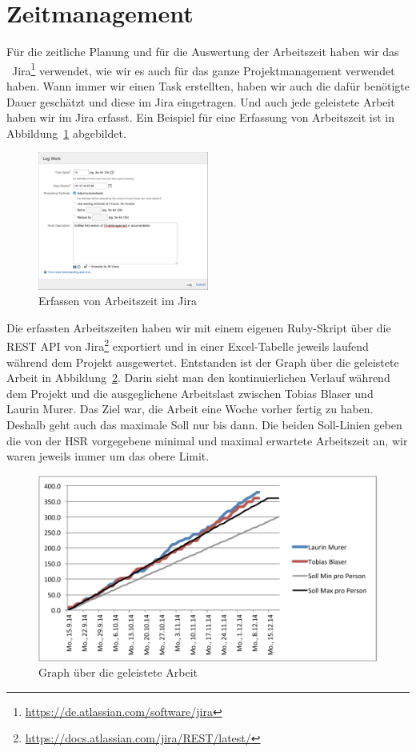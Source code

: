 \chapter*{Zeitmanagement}
	Für die zeitliche Planung und für die Auswertung der Arbeitszeit haben wir das \ppt\ Jira\footnote{\url{https://de.atlassian.com/software/jira}} verwendet,
	wie wir es auch für das ganze Projektmanagement verwendet haben.
	Wann immer wir einen Task erstellten, haben wir auch die dafür benötigte Dauer geschätzt
	und diese im Jira eingetragen.
	Und auch jede geleistete Arbeit haben wir im Jira erfasst.
	Ein Beispiel für eine Erfassung von Arbeitszeit ist in Abbildung\ \ref{fig:logWork} abgebildet.
	\begin{figure}[H]
		\includegraphics[width=0.5\textwidth]{projectPlan/media/img/logWork.png}
		\centering
		\caption{Erfassen von Arbeitszeit im Jira}
		\label{fig:logWork}
	\end{figure}
	
	Die erfassten Arbeitszeiten haben wir mit einem eigenen Ruby-Skript über die REST API von Jira\footnote{\url{https://docs.atlassian.com/jira/REST/latest/}} exportiert
	und in einer Excel-Tabelle jeweils laufend während dem Projekt ausgewertet.
	Entstanden ist der Graph über die geleistete Arbeit in Abbildung\ \ref{fig:workGraph}.
	Darin sieht man den kontinuierlichen Verlauf während dem Projekt
	und die ausgeglichene Arbeitslast zwischen Tobias Blaser und Laurin Murer.
	Das Ziel war, die Arbeit eine Woche vorher fertig zu haben.
	Deshalb geht auch das maximale Soll nur bis dann.
	Die beiden Soll-Linien geben die von der HSR vorgegebene minimal und maximal erwartete Arbeitszeit an,
	wir waren jeweils immer um das obere Limit.
	\begin{figure}[H]
		\includegraphics[width=\textwidth]{projectPlan/media/img/workGraph.pdf}
		\centering
		\caption{Graph über die geleistete Arbeit}
		\label{fig:workGraph}
	\end{figure}

